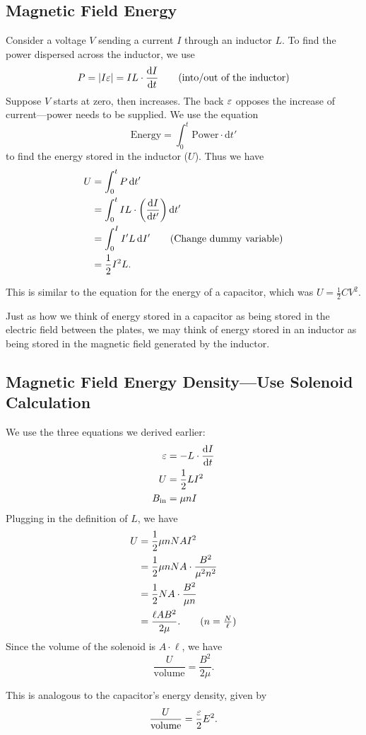 \documentclass[class=article, crop=false]{standalone}
\begin{document}
  \subsection{Magnetic Field Energy}
  Consider a voltage $V$ sending a current $I$ through an inductor $L$. To find the power dispersed across the inductor, we use
  \[
    P = \left\lvert I\varepsilon \right\rvert = IL\cdot \frac{\mathrm{d}I}{\mathrm{d}t}\tag{into/out of the inductor}
  \]
  Suppose $V$ starts at zero, then increases. The back $\varepsilon$ opposes the increase of current---power needs to be supplied. We use the equation
  \[
    \text{Energy} = \int_{0}^{t}\text{Power}\cdot \mathrm{d}t' \tag{$t'$ is dummy variable}
  \]
  to find the energy stored in the inductor ($U$). Thus we have
  \begin{align*}
    U &= \int_{0}^{t}P \,\mathrm{d}t' \\
      &= \int_{0}^{t}IL\cdot \left( \frac{\mathrm{d}I}{\mathrm{d}t'} \right)\mathrm{d}t' \\
      &= \int_{0}^{I}I'L \,\mathrm{d}I' \tag{Change dummy variable}\\
      &= \frac{1}{2}I^2L.
  \end{align*}
  \begin{note}{}
    This is similar to the equation for the energy of a capacitor, which was $U = \frac{1}{2}CV^2$.
  \end{note}
  \begin{note}{}
    Just as how we think of energy stored in a capacitor as being stored in the electric field between the plates, we may think of energy stored in an inductor as being stored in the magnetic field generated by the inductor.
  \end{note}
  \subsection{Magnetic Field Energy Density---Use Solenoid Calculation}
  We use the three equations we derived earlier:
  \begin{align*}
    \varepsilon &= -L\cdot \frac{\mathrm{d}I}{\mathrm{d}t} \\
    U &= \frac{1}{2}LI^2 \\
    B_\text{in} &= \mu nI
  \end{align*}
  Plugging in the definition of $L$, we have
  \begin{align*}
    U &= \frac{1}{2}\mu n NAI^2 \\
      &= \frac{1}{2}\mu nNA\cdot \frac{B^2}{\mu^2 n^2} \\
      &= \frac{1}{2}NA\cdot \frac{B^2}{\mu n} \\
      &= \frac{\ell AB^2}{2\mu}. \tag{$n = \frac{N}{\ell}$}
  \end{align*}
  Since the volume of the solenoid is $A\cdot \ell$, we have
  \[
    \frac{U}{\text{volume}} = \frac{B^2}{2\mu}.
  \]
  \begin{note}{}
    This is analogous to the capacitor's energy density, given by
    \[
      \frac{U}{\text{volume}} = \frac{\varepsilon}{2}E^2.
    \]
  \end{note}
\end{document}

